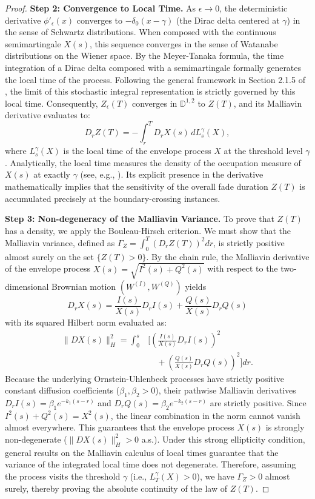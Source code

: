\documentclass[11pt]{article}
\begin{document}
\begin{proof}
\textbf{Step 2: Convergence to Local Time.}
As $\epsilon \to 0$, the deterministic derivative $\phi'_\epsilon(x)$ converges to $-\delta_0(x - \gamma)$ (the Dirac delta centered at $\gamma$) in the sense of Schwartz distributions. When composed with the continuous semimartingale $X(s)$, this sequence converges in the sense of Watanabe distributions on the Wiener space. By the Meyer-Tanaka formula, the time integration of a Dirac delta composed with a semimartingale formally generates the local time of the process. Following the general framework in Section 2.1.5 of \citet{nualart2006malliavin}, the limit of this stochastic integral representation is strictly governed by this local time. Consequently, $Z_\epsilon(T)$ converges in $\mathbb{D}^{1,2}$ to $Z(T)$, and its Malliavin derivative evaluates to:
\begin{equation}
    D_r Z(T) = - \int_r^T D_r X(s) \, dL_s^\gamma(X),
\end{equation}
where $L_s^\gamma(X)$ is the local time of the envelope process $X$ at the threshold level $\gamma$. Analytically, the local time measures the density of the occupation measure of $X(s)$ at exactly $\gamma$ (see, e.g., \citet{revuz1999continuous}). Its explicit presence in the derivative mathematically implies that the sensitivity of the overall fade duration $Z(T)$ is accumulated precisely at the boundary-crossing instances.

\textbf{Step 3: Non-degeneracy of the Malliavin Variance.}
To prove that $Z(T)$ has a density, we apply the Bouleau-Hirsch criterion. We must show that the Malliavin variance, defined as $\Gamma_Z = \int_0^T (D_r Z(T))^2 dr$, is strictly positive almost surely on the set $\{Z(T) > 0\}$. By the chain rule, the Malliavin derivative of the envelope process $X(s) = \sqrt{I^2(s) + Q^2(s)}$ with respect to the two-dimensional Brownian motion $(W^{(I)}, W^{(Q)})$ yields 
$$
D_r X(s) = \frac{I(s)}{X(s)} D_r I(s) + \frac{Q(s)}{X(s)} D_r Q(s)
$$
with its squared Hilbert norm evaluated as:
\begin{align}
    \|D X(s)\|_H^2 = \int_0^s& \Bigg[ \left(\frac{I(s)}{X(s)} D_r I(s)\right)^2 \nonumber\\
    & \quad + \left(\frac{Q(s)}{X(s)} D_r Q(s)\right)^2 \Bigg] dr.
\end{align}
Because the underlying Ornstein-Uhlenbeck processes have strictly positive constant diffusion coefficients ($\beta_1, \beta_2 > 0$), their pathwise Malliavin derivatives $D_r I(s) = \beta_1 e^{-k_1(s-r)}$ and $D_r Q(s) = \beta_2 e^{-k_2(s-r)}$ are strictly positive. Since $I^2(s) + Q^2(s) = X^2(s)$, the linear combination in the norm cannot vanish almost everywhere. This guarantees that the envelope process $X(s)$ is strongly non-degenerate ($\|D X(s)\|_H^2 > 0$ a.s.). Under this strong ellipticity condition, general results on the Malliavin calculus of local times guarantee that the variance of the integrated local time does not degenerate. Therefore, assuming the process visits the threshold $\gamma$ (i.e., $L_T^\gamma(X) > 0$), we have $\Gamma_Z > 0$ almost surely, thereby proving the absolute continuity of the law of $Z(T)$.


\end{proof}
\end{document}
